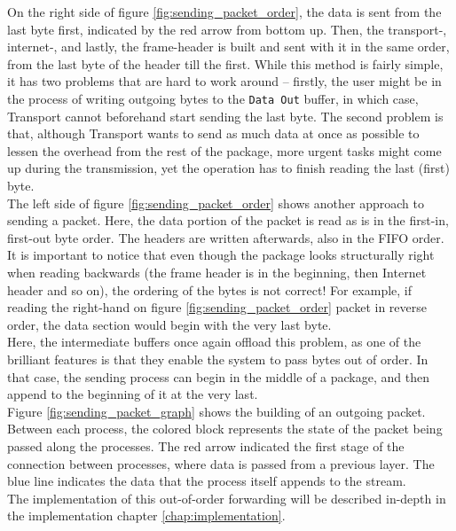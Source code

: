 On the right side of figure \ref{fig:sending_packet_order}, the data is sent
from the last byte first, indicated by the red arrow from bottom
up. Then, the
transport-, internet-, and lastly, the frame-header is built and sent with it
in the same order, from the last byte of the header till the first.
While this method is fairly simple, it has two problems that are hard to work
around -- firstly, the user might be in the process of writing outgoing bytes
to the \texttt{Data Out} buffer, in which case, Transport cannot beforehand
start sending the last byte. The second problem is that, although Transport
wants to send as much data at once as possible to lessen the overhead from the
rest of the package, more urgent tasks might come up during the transmission,
yet the operation has to finish reading the last (first) byte.\\
The left side of figure \ref{fig:sending_packet_order} shows another approach
to sending a packet. Here, the data portion of the packet is read as is in the
first-in, first-out byte order. The headers are written afterwards, also in the
FIFO order. It is important to notice that even though the package looks
structurally right when reading backwards (the frame header is in the beginning,
then Internet header and so on), the ordering of the bytes is not correct! For
example, if reading the right-hand on figure \ref{fig:sending_packet_order}
packet in reverse order, the data section would begin with the very last byte.
\\
Here, the intermediate buffers once again offload this problem, as one of the
brilliant features is that they enable the system to pass bytes out of order.
In that case, the sending process can begin in the middle of a package, and then
append to the beginning of it at the very last.\\
Figure \ref{fig:sending_packet_graph} shows the building of an outgoing packet.
Between each process, the colored block represents the state of the packet
being passed along the processes. The red arrow indicated the first stage of
the connection between processes, where data is passed from a previous layer.
The blue line indicates the data that the process itself appends to the stream.\\
The implementation of this out-of-order forwarding will be described in-depth
in the implementation chapter \ref{chap:implementation}.

